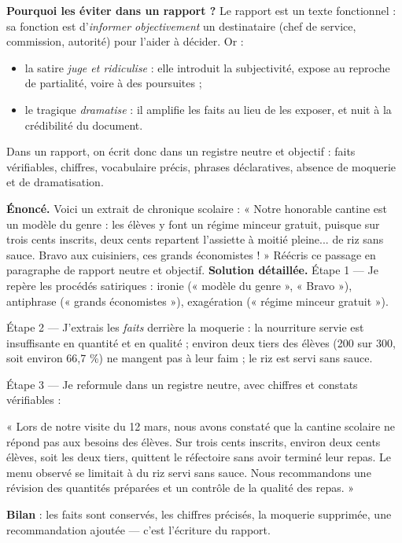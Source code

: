 \documentclass[11pt]{article}
\newcommand{\cle}[1]{{\popxbold\color{popdark}#1}}
\begin{document}
\textbf{Pourquoi les éviter dans un rapport ?} Le rapport est un \cle{texte fonctionnel} : sa fonction est d'\emph{informer objectivement} un destinataire (chef de service, commission, autorité) pour l'aider à décider. Or :
\begin{itemize}
\item la satire \emph{juge et ridiculise} : elle introduit la subjectivité, expose au reproche de partialité, voire à des poursuites ;
\item le tragique \emph{dramatise} : il amplifie les faits au lieu de les exposer, et nuit à la crédibilité du document.
\end{itemize}
Dans un rapport, on écrit donc dans un registre \cle{neutre} et \cle{objectif} : faits vérifiables, chiffres, vocabulaire précis, phrases déclaratives, absence de moquerie et de dramatisation.

\begin{exoresolu}
\textbf{Énoncé.} Voici un extrait de chronique scolaire : « Notre honorable cantine est un modèle du genre : les élèves y font un régime minceur gratuit, puisque sur trois cents inscrits, deux cents repartent l'assiette à moitié pleine... de riz sans sauce. Bravo aux cuisiniers, ces grands économistes ! » Réécris ce passage en paragraphe de rapport neutre et objectif.
\tcblower
\textbf{Solution détaillée.}
Étape 1 — Je repère les procédés satiriques : ironie (« modèle du genre », « Bravo »), antiphrase (« grands économistes »), exagération (« régime minceur gratuit »).

Étape 2 — J'extrais les \emph{faits} derrière la moquerie : la nourriture servie est insuffisante en quantité et en qualité ; environ deux tiers des élèves (200 sur 300, soit environ 66,7 \%) ne mangent pas à leur faim ; le riz est servi sans sauce.

Étape 3 — Je reformule dans un registre neutre, avec chiffres et constats vérifiables :

« Lors de notre visite du 12 mars, nous avons constaté que la cantine scolaire ne répond pas aux besoins des élèves. Sur trois cents inscrits, environ deux cents élèves, soit les deux tiers, quittent le réfectoire sans avoir terminé leur repas. Le menu observé se limitait à du riz servi sans sauce. Nous recommandons une révision des quantités préparées et un contrôle de la qualité des repas. »

\textbf{Bilan} : les faits sont conservés, les chiffres précisés, la moquerie supprimée, une recommandation ajoutée — c'est l'écriture du rapport.
\end{exoresolu}
\end{document}
